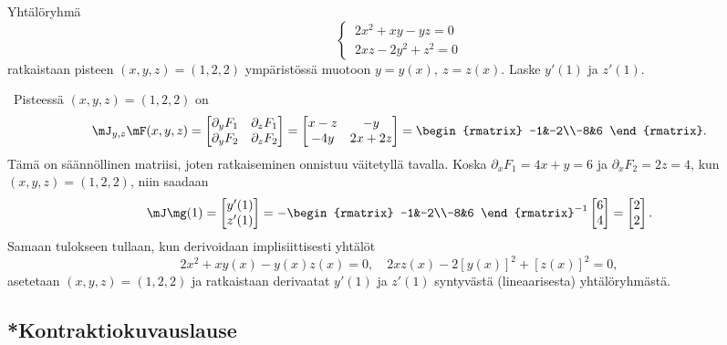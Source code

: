 \begin{Exa} Yhtälöryhmä
\[
\begin{cases} \,2x^2+xy-yz=0 \\ \,2xz-2y^2+z^2=0 \end{cases}
\]
ratkaistaan pisteen $(x,y,z)=(1,2,2)$ ympäristössä muotoon $y=y(x),\ z=z(x)$. Laske
$y'(1)$ ja $z'(1)$.
\end{Exa}
\ratk \ Pisteessä $(x,y,z)=(1,2,2)$ on
\[
\mJ_{y,z}\mF(x,y,z) = \begin{bmatrix} 
                      \partial_y F_1 & \partial_z F_1 \\ \partial_y F_2 & \partial_z F_2 
                      \end{bmatrix} 
                   = \begin{bmatrix} x-z & -y \\ -4y & 2x+2z \end{bmatrix}
                   = \begin{rmatrix} -1&-2\\-8&6 \end{rmatrix}.
\]
Tämä on säännöllinen matriisi, joten ratkaiseminen onnistuu väitetyllä tavalla. Koska 
$\partial_x F_1=4x+y=6$ ja $\partial_x F_2=2z=4$, kun $(x,y,z)=(1,2,2)$, niin saadaan
\[
\mJ\mg(1)=\begin{bmatrix} y'(1)\\z'(1) \end{bmatrix}
         = -\begin{rmatrix} -1&-2\\-8&6 \end{rmatrix}^{-1} \begin{bmatrix} 6\\4 \end{bmatrix}
         = \begin{bmatrix} 2\\2 \end{bmatrix}. 
\]
Samaan tulokseen tullaan, kun derivoidaan implisiittisesti yhtälöt
\[
2x^2+xy(x)-y(x)z(x)=0, \quad 2xz(x)-2[y(x)]^2+[z(x)]^2=0,
\]
asetetaan $(x,y,z)=(1,2,2)$ ja ratkaistaan derivaatat $y'(1)$ ja $z'(1)$ syntyvästä
(lineaarisesta) yhtälöryhmästä. \loppu

\subsection*{*Kontraktiokuvauslause}

